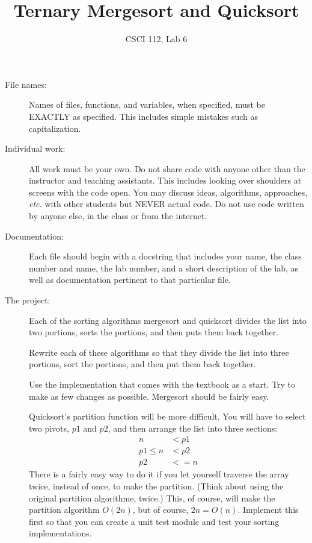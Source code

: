 \documentclass{article}
\title{Ternary Mergesort and Quicksort}
\author{CSCI 112, Lab 6}
\date{}
\begin{document}
\sloppy

\maketitle

\begin{description} 
\item[File names:]  Names of files, functions, and variables, 
when specified,
must be EXACTLY as specified.  This includes simple mistakes such
as capitalization.

\item[Individual work:]  All work must be your own.  Do not share
code with anyone other than the instructor and teaching assistants.
This includes looking over shoulders at screens with the code open.
You may discuss ideas, algorithms, approaches, {\em etc.} with
other students but NEVER actual code.  Do not use code
written by anyone else, in the class or from the internet.

\item[Documentation:] Each file should begin with a docstring
that includes your name, the class number and name, the lab
number, and  
a short description of the lab, as well as documentation pertinent
to that particular file.

\item[The project:]  Each of the sorting algorithms mergesort and quicksort
divides the list into two portions, sorts the portions, and then puts them
back together. 

Rewrite each of these algorithms so that they divide the list into three
portions, sort the portions, and then put them back together.

Use the implementation that comes with the textbook as a start.
Try to make as few changes as possible.  Mergesort should be
fairly easy.  

Quicksort's partition function will be more difficult.
You will have to select two pivots, $p1$ and $p2$, and then
arrange the list into three sections:
\begin{align*}
n &< p1\\
p1 \leq n &< p2\\
p2 &<= n
\end{align*}
There is a fairly easy way to do it if you let yourself traverse
the array twice, instead of once, to make the partition.
(Think about using the original partition algorithme, twice.)
This, of course, will make the partition algorithm $O(2n)$,
but of course, $2n = O(n)$.
Implement this first so that you can create a unit test module
and test your sorting implementations.


\end{description}
\end{document}
